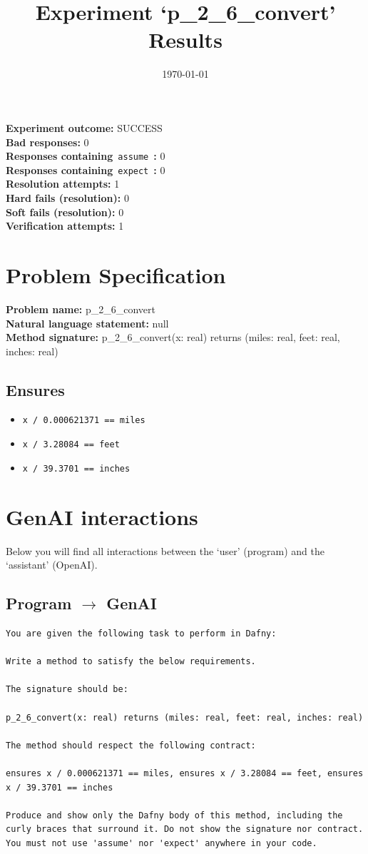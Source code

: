 \documentclass{article}
\begin{document}
\title{Experiment `p\_2\_6\_convert' Results}
\author{\today}
\date{}
\maketitle
\textbf{Experiment outcome: }SUCCESS
\\\textbf{Bad responses: }0
\\\textbf{Responses containing}~\texttt{assume}~\textbf{: }0
\\\textbf{Responses containing}~\texttt{expect}~\textbf{: }0
\\\textbf{Resolution attempts: }1
\\\textbf{Hard fails (resolution): }0
\\\textbf{Soft fails (resolution): }0
\\\textbf{Verification attempts: }1
\section*{Problem Specification}
\textbf{Problem name: }p\_2\_6\_convert
\\\textbf{Natural language statement: }null
\\\textbf{Method signature: }p\_2\_6\_convert(x: real) returns (miles: real, feet: real, inches: real)
\subsection*{Ensures}
\begin{itemize}
\item \texttt{x / 0.000621371 == miles}
\item \texttt{x / 3.28084 == feet}
\item \texttt{x / 39.3701 == inches}
\end{itemize}
\clearpage
\section*{GenAI interactions}
Below you will find all interactions between the `user' (program) and the `assistant' (OpenAI).
\subsection*{Program $\rightarrow$ GenAI}
\begin{lstlisting}
You are given the following task to perform in Dafny:

Write a method to satisfy the below requirements.

The signature should be:

p_2_6_convert(x: real) returns (miles: real, feet: real, inches: real)

The method should respect the following contract:

ensures x / 0.000621371 == miles, ensures x / 3.28084 == feet, ensures x / 39.3701 == inches

Produce and show only the Dafny body of this method, including the curly braces that surround it. Do not show the signature nor contract. You must not use 'assume' nor 'expect' anywhere in your code.
\end{lstlisting}
\end{document}
